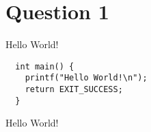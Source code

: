 \section{Question 1}\label{question-1}

Hello World!

\begin{program}
\begin{lstlisting}
  int main() {
    printf("Hello World!\n");
    return EXIT_SUCCESS;
  }
\end{lstlisting}
  \caption{Hello World!}
\end{program}
